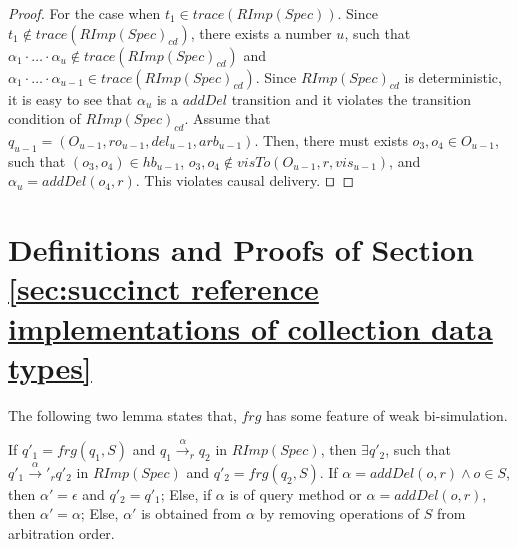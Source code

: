 \begin {proof}
For the case when $t_1 \in \mathit{trace}( \mathit{RImp}(\mathit{Spec}) )$. Since $t_1 \notin \mathit{trace}( \mathit{RImp}(\mathit{Spec})_{\mathit{cd}} )$, there exists a number $u$, such that $\alpha_1 \cdot \ldots \cdot \alpha_u \notin \mathit{trace}( \mathit{RImp}(\mathit{Spec})_{\mathit{cd}} )$ and $\alpha_1 \cdot \ldots \cdot \alpha_{u-1} \in \mathit{trace}( \mathit{RImp}(\mathit{Spec})_{\mathit{cd}} )$. Since $\mathit{RImp}(\mathit{Spec})_{\mathit{cd}}$ is deterministic, it is easy to see that $\alpha_u$ is a $\mathit{addDel}$ transition and it violates the transition condition of $\mathit{RImp}(\mathit{Spec})_{\mathit{cd}}$. Assume that $q_{\mathit{u-1}} = (O_{u-1},\mathit{ro}_{u-1},\mathit{del}_{u-1},\mathit{arb}_{u-1})$. Then, there must exists $o_3,o_4 \in O_{u-1}$, such that $(o_3,o_4) \in \mathit{hb}_{u-1}$, $o_3,o_4 \notin \mathit{visTo}(O_{u-1},r,\mathit{vis}_{u-1})$, and $\alpha_u = \mathit{addDel}(o_4,r)$. This violates causal delivery. $\qed$
\end {proof}













\section{Definitions and Proofs of Section \ref{sec:succinct reference implementations of collection data types}}
\label{sec:appendix definitions and proofs of section succinct reference implementations of collection data types}

The following two lemma states that, $\mathit{frg}$ has some feature of weak bi-simulation. 

\begin{lemma}
\label{lemma:RImpSpec is simulated by SRimpSpec} 
If $q'_1 = \mathit{frg}(q_1,S)$ and $q_1 {\xrightarrow{\alpha}}_r q_2$ in $\mathit{RImp}(\mathit{Spec})$, then $\exists q'_2$, such that $q'_1 {\xrightarrow{\alpha}'}_r q'_2$ in $\mathit{RImp}(\mathit{Spec})$ and $q'_2 = \mathit{frg}(q_2,S)$. If $\alpha = \mathit{addDel}(o,r) \wedge o \in S$, then $\alpha' = \epsilon$ and $q'_2 = q'_1$; Else, if $\alpha$ is of query method or $\alpha = \mathit{addDel}(o,r)$, then $\alpha' = \alpha$; Else, $\alpha'$ is obtained from $\alpha$ by removing operations of $S$ from arbitration order.
\end{lemma}

